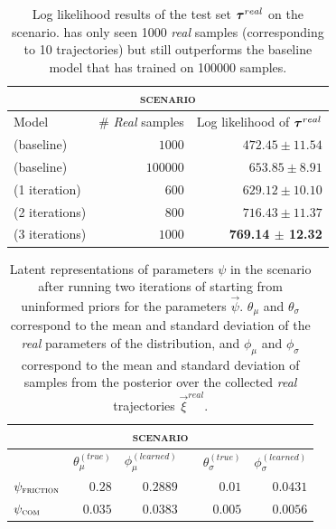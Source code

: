 \begin{table}
\centering
\begin{tabular}{lrr}
\multicolumn{3}{c}{\textsc{\MakeLowercase{\yp{} scenario}}} \\
\toprule
Model & \# \emph{Real} samples & Log likelihood of $\boldsymbol{\tau}^{real}$ \\
\midrule
\cvae{} (baseline) & $1000$ & $472.45 \pm 11.54$\\
\cvae{} (baseline) & $100000$ & $653.85 \pm 8.91$ \\
\dettostoc{} (1 iteration) & $600$ & $629.12 \pm 10.10$ \\
\dettostoc{} (2 iterations) & $800$ & $716.43 \pm 11.37$\\
\dettostoc{} (3 iterations) & $1000$ & \textbf{769.14 $\pm$ 12.32}\\

\bottomrule
\end{tabular}
\caption{Log likelihood results of the test set $\boldsymbol{\tau}^{real}{}$ on the \yp{} scenario. \dettostoc{} has only seen 1000 \emph{real} samples (corresponding to 10 trajectories) but still outperforms the baseline model that has trained on 100000 samples.}
\label{table:yumi_results}
\end{table}

\begin{table}
\centering
\begin{tabular}{lrrcrr}
\multicolumn{6}{c}{\textsc{\MakeLowercase{\yp{} scenario}}} \\
\toprule
& $\theta_\mu^{(true)}$ & $\phi_\mu^{(learned)}$ && $\theta_\sigma^{(true)}$ & $\phi_\sigma^{(learned)}$ \\
\midrule
$\psi_{\textsc{friction}}$ & $0.28$ & $0.2889$ && $0.01$ & $0.0431$ \\
$\psi_{\textsc{com}}$ & $0.035$ & $ 0.0383$ && $0.005$ & $0.0056$ \\
\bottomrule
\end{tabular}
\caption{Latent representations of parameters $\psi$ in the \yp{} scenario after running two iterations of \dettostoc{} starting from uninformed priors for the parameters $\vec{\psi}$. $\theta_\mu$ and $\theta_\sigma$ correspond to the mean and standard deviation of the \emph{real} parameters of the distribution, and $\phi_\mu$ and $\phi_\sigma$ correspond to the mean and standard deviation of samples from the posterior over the collected \emph{real} trajectories $\vec{\xi}^{real}$.}
\label{table:yumi_parameters}
\end{table}

